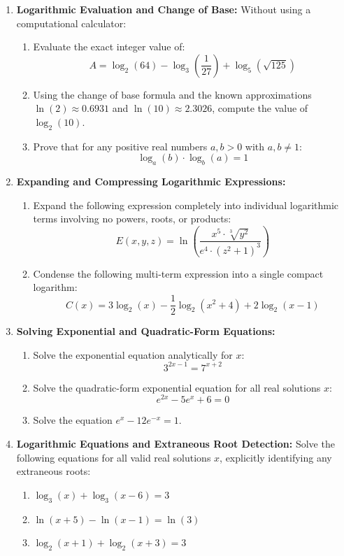 \begin{enumerate}
    \item \textbf{Logarithmic Evaluation and Change of Base:} Without using a computational calculator:
    \begin{enumerate}
        \item Evaluate the exact integer value of:
        $$A = \log_2(64) - \log_3\left(\frac{1}{27}\right) + \log_5(\sqrt{125})$$
        \item Using the change of base formula and the known approximations $\ln(2) \approx 0.6931$ and $\ln(10) \approx 2.3026$, compute the value of $\log_2(10)$.
        \item Prove that for any positive real numbers $a, b > 0$ with $a, b \neq 1$:
        $$\log_a(b) \cdot \log_b(a) = 1$$
    \end{enumerate}

    \item \textbf{Expanding and Compressing Logarithmic Expressions:}
    \begin{enumerate}
        \item Expand the following expression completely into individual logarithmic terms involving no powers, roots, or products:
        $$E(x, y, z) = \ln\left( \frac{x^5 \cdot \sqrt[3]{y^2}}{e^4 \cdot (z^2 + 1)^3} \right)$$
        \item Condense the following multi-term expression into a single compact logarithm:
        $$C(x) = 3\log_2(x) - \frac{1}{2}\log_2(x^2 + 4) + 2\log_2(x - 1)$$
    \end{enumerate}

    \item \textbf{Solving Exponential and Quadratic-Form Equations:}
    \begin{enumerate}
        \item Solve the exponential equation analytically for $x$:
        $$3^{2x - 1} = 7^{x + 2}$$
        \item Solve the quadratic-form exponential equation for all real solutions $x$:
        $$e^{2x} - 5e^x + 6 = 0$$
        \item Solve the equation $e^x - 12 e^{-x} = 1$.
    \end{enumerate}

    \item \textbf{Logarithmic Equations and Extraneous Root Detection:} Solve the following equations for all valid real solutions $x$, explicitly identifying any extraneous roots:
    \begin{enumerate}
        \item $\log_3(x) + \log_3(x - 6) = 3$
        \item $\ln(x + 5) - \ln(x - 1) = \ln(3)$
        \item $\log_2(x + 1) + \log_2(x + 3) = 3$
    \end{enumerate}


\end{enumerate}
